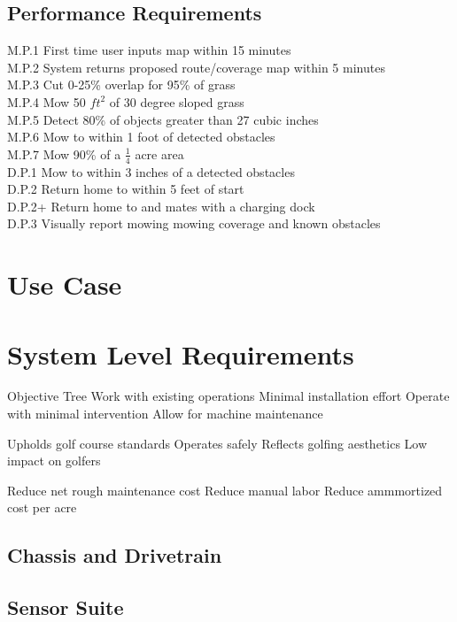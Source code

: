\documentclass{article}
\begin{document}
\subsection{Performance Requirements}
M.P.1 First time user inputs map within 15 minutes \\
M.P.2 System returns proposed route/coverage map within 5 minutes \\
M.P.3 Cut 0-25\% overlap for 95\% of grass \\
M.P.4 Mow 50 $ft^2$ of 30 degree sloped grass \\
M.P.5 Detect 80\% of objects greater than 27 cubic inches \\
M.P.6 Mow to within 1 foot of detected obstacles \\
M.P.7 Mow 90\% of a $\frac{1}{4}$ acre area \\

\noindent
D.P.1 Mow to within 3 inches of a detected obstacles \\
D.P.2 Return home to within 5 feet of start \\
D.P.2+ Return home to and mates with a charging dock \\
D.P.3 Visually report mowing mowing coverage and known obstacles \\

\section{Use Case}

\section{System Level Requirements}
Objective Tree
Work with existing operations
  Minimal installation effort
  Operate with minimal intervention
  Allow for machine maintenance

Upholds golf course standards
  Operates safely 
  Reflects golfing aesthetics
  Low impact on golfers
  
Reduce net rough maintenance cost
  Reduce manual labor
  Reduce ammmortized cost per acre
  
\subsection{Chassis and Drivetrain}
\subsection{Sensor Suite}
\end{document}
